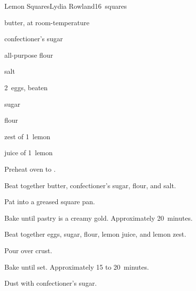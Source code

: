 \begin{recipe}{Lemon Squares}{Lydia Rowland}{16~squares}

\begin{ingredients}
\item \C{\half} butter, at room-temperature
\item \C{\quarter} confectioner's sugar
\item {} all-purpose flour
\item \tp{\half} salt
\item 2~eggs, beaten
\item {} sugar
\item {} flour
\item zest of 1~lemon
\item juice of 1~lemon
\end{ingredients}

\begin{directions}
\item Preheat oven to .
\item Beat together butter, confectioner's sugar,  flour, and salt.
\item Pat into a greased  square pan.
\item Bake until pastry is a creamy gold. Approximately 20~minutes.
\item Beat together eggs, sugar,  flour, lemon juice, and lemon zest.
\item Pour over crust.
\item Bake until set. Approximately 15 to 20~minutes.
\item Dust with confectioner's sugar.
\end{directions}
\end{recipe}
